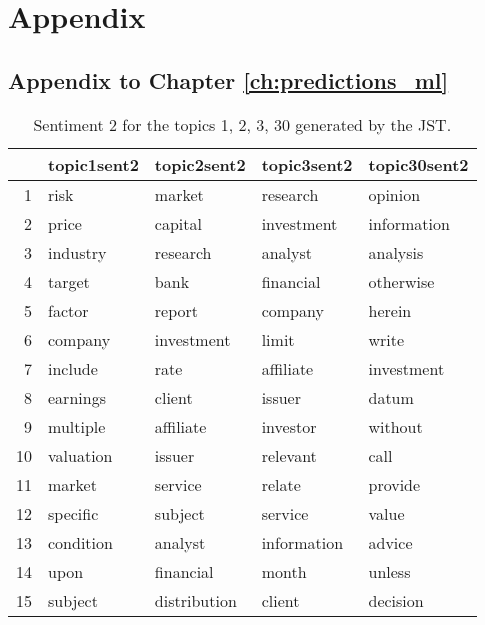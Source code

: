 \chapter{Appendix}\label{ch:appAlabel}






\section{Appendix to Chapter \ref{ch:predictions_ml}}

\begin{table}[ht]
\centering
\begin{tabular}{rllll}
  \hline
 & topic1sent2 & topic2sent2 & topic3sent2 & topic30sent2 \\ 
  \hline
1 & risk & market & research & opinion \\ 
  2 & price & capital & investment & information \\ 
  3 & industry & research & analyst & analysis \\ 
  4 & target & bank & financial & otherwise \\ 
  5 & factor & report & company & herein \\ 
  6 & company & investment & limit & write \\ 
  7 & include & rate & affiliate & investment \\ 
  8 & earnings & client & issuer & datum \\ 
  9 & multiple & affiliate & investor & without \\ 
  10 & valuation & issuer & relevant & call \\ 
  11 & market & service & relate & provide \\ 
  12 & specific & subject & service & value \\ 
  13 & condition & analyst & information & advice \\ 
  14 & upon & financial & month & unless \\ 
  15 & subject & distribution & client & decision \\ 
   \hline
\end{tabular}
\caption{Sentiment 2 for the topics 1, 2, 3, 30 generated by the JST.}
\label{tab:postProbSent2}
\end{table}



